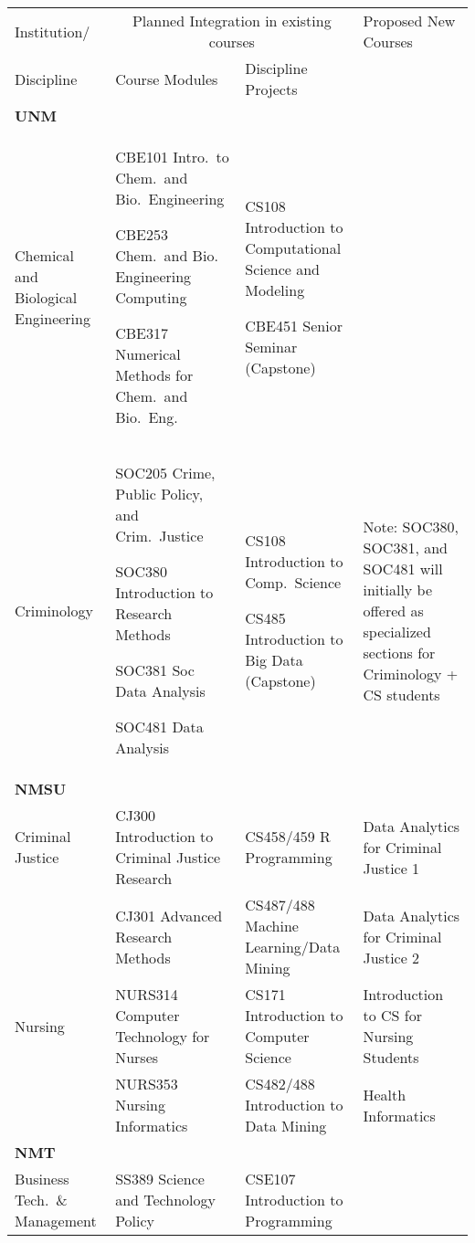 \begin{table}[tbh!]
\begin{tabular}{|p{1in}|p{1.75in}|p{1.5in}|p{1.5in}|}
\hline
\hline
     Institution/ & \multicolumn{2}{c|}{Planned Integration in existing courses} & Proposed New Courses\\ 
     \cline{2-3}
     Discipline   & Course Modules & Discipline Projects                   & \\
     \hline\hline
     \textbf{UNM} & & &  \\  
     \hline
     Chemical and Biological Engineering 
                & CBE101 Intro.\ to Chem.\ and Bio.\ Engineering
                
                  CBE253 Chem.\ and Bio. Engineering Computing
                  
                  CBE317 Numerical Methods for Chem.\ and Bio.\ Eng.
                & CS108 Introduction to Computational Science and Modeling
                
                  CBE451 Senior Seminar (Capstone)
                &\\
     \hline
     Criminology & SOC205 Crime, Public Policy, and Crim.\ Justice
     
                  SOC380 Introduction to Research Methods 
                  
                  SOC381 Soc Data Analysis
                  
                  SOC481 Data Analysis
                & CS108 Introduction to Comp.\ Science
                
                  CS485 Introduction to Big Data (Capstone)
                & Note: SOC380, SOC381, and SOC481 will initially be offered as specialized sections for Criminology + CS students\\
     \hline\hline
     \textbf{NMSU} & & & \\
     \hline
     Criminal Justice & %
                       CJ300 Introduction to Criminal Justice Research
                      & CS458/459 R Programming 
                      & Data Analytics for Criminal Justice 1 \\
                      & CJ301 Advanced Research Methods     %
                      & CS487/488 Machine Learning/Data Mining & 
                        Data Analytics for Criminal Justice 2 \\
     \hline
     Nursing & NURS314 Computer Technology for Nurses    
             & CS171 Introduction to Computer Science & Introduction to CS for Nursing Students\\ 
             & NURS353 Nursing Informatics & CS482/488 Introduction to Data Mining & Health Informatics \\
    \hline\hline
     \textbf{NMT} & & & \\                 
     \hline
     Business Tech.\ \& Management 
                    & SS389 Science and                Technology Policy
                    & CSE107 Introduction to Programming
                    

\end{tabular}
\end{table}
